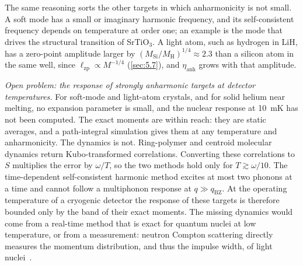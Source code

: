 The same reasoning sorts the other targets in which anharmonicity is not small. A soft mode has a small or imaginary harmonic frequency, and its self-consistent frequency depends on temperature at order one; an example is the mode that drives the structural transition of SrTiO$_3$. A light atom, such as hydrogen in LiH, has a zero-point amplitude larger by $(M_{\mathrm{Si}}/M_{\mathrm{H}})^{1/4} \approx 2.3$ than a silicon atom in the same well, since $\ell_{\mathrm{zp}} \propto M^{-1/4}$ (\cref{sec:5.7}), and $\eta_{\mathrm{anh}}$ grows with that amplitude.

\emph{Open problem: the response of strongly anharmonic targets at detector temperatures.} For soft-mode and light-atom crystals, and for solid helium near melting, no expansion parameter is small, and the nuclear response at \SI{10}{mK} has not been computed. The exact moments are within reach: they are static averages, and a path-integral simulation gives them at any temperature and anharmonicity. The dynamics is not. Ring-polymer and centroid molecular dynamics return Kubo-transformed correlations. Converting these correlations to $S$ multiplies the error by $\omega/T$, so the two methods hold only for $T \gtrsim \omega/10$. The time-dependent self-consistent harmonic method excites at most two phonons at a time and cannot follow a multiphonon response at $q \gg q_{\mathrm{BZ}}$. At the operating temperature of a cryogenic detector the response of these targets is therefore bounded only by the band of their exact moments. The missing dynamics would come from a real-time method that is exact for quantum nuclei at low temperature, or from a measurement: neutron Compton scattering directly measures the momentum distribution, and thus the impulse width, of light nuclei~\cite{andreani2005measurement}.
